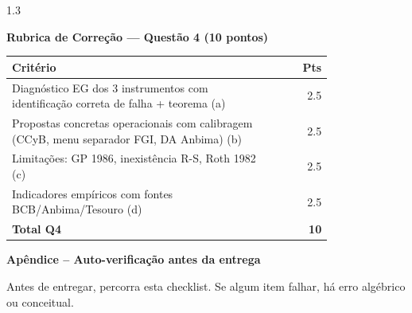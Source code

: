 \documentclass[11pt,addpoints]{exam}
\begin{document}
\begin{spacing}{1.3}
\begin{questions}
\begin{parts}
\end{parts}

\ifprintanswers
\vspace{1em}
{\color{rubred}
\noindent\textbf{Rubrica de Correção --- Questão 4 (10 pontos)}
\vspace{0.3em}

\noindent\small
\begin{tabular}{@{}p{0.80\linewidth} r@{}}
\toprule
\textbf{Critério} & \textbf{Pts} \\
\midrule
Diagnóstico EG dos 3 instrumentos com identificação correta de falha + teorema (a) & 2.5 \\
Propostas concretas operacionais com calibragem (CCyB, menu separador FGI, DA Anbima) (b) & 2.5 \\
Limitações: GP 1986, inexistência R-S, Roth 1982 (c) & 2.5 \\
Indicadores empíricos com fontes BCB/Anbima/Tesouro (d) & 2.5 \\
\midrule
\textbf{Total Q4} & \textbf{10} \\
\bottomrule
\end{tabular}\normalsize
}
\fi

\end{questions}
\end{spacing}

\newpage
\begin{center}\large\textbf{Apêndice -- Auto-verificação antes da entrega}\end{center}
\vspace{0.5em}

\noindent Antes de entregar, percorra esta checklist. Se algum item falhar, há erro algébrico ou conceitual.
\end{document}
